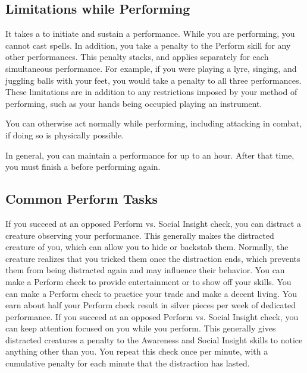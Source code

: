         \subsection{Limitations while Performing}
            It takes a  to initiate and sustain a performance.
            While you are performing, you cannot cast spells.
            In addition, you take a  penalty to the Perform skill for any other performances.
            This penalty stacks, and applies separately for each simultaneous performance.
            For example, if you were playing a lyre, singing, and juggling balls with your feet, you would take a  penalty to all three performances.
            These limitations are in addition to any restrictions imposed by your method of performing, such as your hands being occupied playing an instrument.

            You can otherwise act normally while performing, including attacking in combat, if doing so is physically possible.

        In general, you can maintain a performance for up to an hour.
        After that time, you must finish a  before performing again.

    \subsection{Common Perform Tasks}
         If you succeed at an opposed Perform vs. Social Insight check, you can distract a creature observing your performance.
        This generally makes the distracted creature  \partiallyunaware of you, which can allow you to hide or backstab them.
        Normally, the creature realizes that you tricked them once the distraction ends, which prevents them from being distracted again and may influence their behavior.
         You can make a Perform check to provide entertainment or to show off your skills.
         You can make a Perform check to practice your trade and make a decent living.
        You earn about half your Perform check result in silver pieces per week of dedicated performance.
         If you succeed at an opposed Perform vs. Social Insight check, you can keep attention focused on you while you perform.
        This generally gives distracted creatures a  penalty to the Awareness and Social Insight skills to notice anything other than you.
        You repeat this check once per minute, with a cumulative  penalty for each minute that the distraction has lasted.

